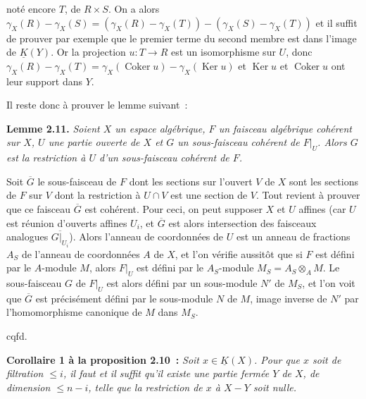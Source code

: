 noté
encore $T$, de $R\times S$. On a alors $\gamma_X(R)-\gamma_X(S)=(\gamma_X(R)-\gamma_X(T))-(\gamma_X(S)-\gamma_X(T))$ et il suffit de prouver par exemple que le premier terme du second membre est dans l'image de $\underline K(Y)$. Or la projection $u:T\longrightarrow R$ est un isomorphisme sur $U$, donc $\gamma_X(R)-\gamma_X(T)=\gamma_X(\operatorname{Coker}u)-\gamma_X(\operatorname{Ker}u)$ et $\operatorname{Ker}u$ et $\operatorname{Coker}u$ ont leur support dans $Y$.

Il reste donc à prouver le lemme suivant~:

\textbf{Lemme 2.11.} \emph{Soient $X$ un espace algébrique, $F$ un faisceau algébrique cohérent sur $X$, $U$ une partie ouverte de $X$ et $G$ un sous-faisceau cohérent de $F|_U$. Alors $G$ est la restriction à $U$ d'un sous-faisceau cohérent de $F$.}

Soit $\overline G$ le sous-faisceau de $F$ dont les sections sur l'ouvert $V$ de $X$ sont les sections de $F$ sur $V$ dont la restriction à $U\cap V$ est une section de $V$. Tout revient à prouver que ce faisceau $\overline G$ est cohérent. Pour ceci, on peut supposer $X$ et $U$ affines (car $U$ est réunion d'ouverts affines $U_i$, et $\overline G$ est alors intersection des faisceaux analogues $\overline{G|_{U_i}}$). Alors l'anneau de coordonnées de $U$ est un anneau de fractions $A_S$ de l'anneau de coordonnées $A$ de $X$, et l'on vérifie aussitôt que si $F$ est défini par le $A$-module $M$, alors $F|_U$ est défini par le $A_S$-module $M_S=A_S\otimes_A M$. Le sous-faisceau $G$ de $F|_U$ est alors défini par un sous-module $N'$ de $M_S$, et l'on voit que $\overline G$ est précisément défini par le sous-module $N$ de $M$, image inverse de $N'$ par l'homomorphisme canonique de $M$ dans $M_S$.
\begin{flushright}cqfd.\end{flushright}

\textbf{Corollaire 1 à la proposition 2.10~:} \emph{Soit $x\in\underline K(X)$. Pour que $x$ soit de filtration $\leq i$, il faut et il suffit qu'il existe une partie fermée $Y$ de $X$, de dimension $\leq n-i$, telle que la restriction de $x$ à $X-Y$ soit nulle.}

